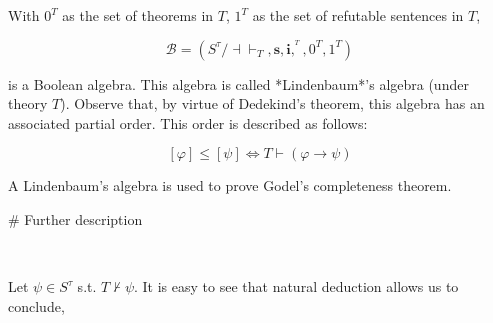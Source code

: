 \documentclass[a4paper, 12pt]{article}
\begin{document}
With $0^T$ as the set of theorems in $T$, $1^T$ as the set of refutable
sentences in $T$,

\begin{equation*}
    \mathcal{B} = \left( S^\tau / \dashv \vdash_T, \textbf{s}, \textbf{i}, ^{^T}, 0^T, 1^T \right) 
\end{equation*}

is a Boolean algebra. This algebra is called *Lindenbaum*'s algebra 
(under theory $T$). Observe that, by virtue of Dedekind's theorem,
this algebra has an associated partial order. This order is described 
as follows: 

\begin{equation*}
    \left[ \varphi \right] \leq \left[ \psi \right]  \iff T \vdash \left( \varphi \to \psi \right) 
\end{equation*}

A Lindenbaum's algebra is used to prove Godel's completeness theorem.

# Further description 

~

Let $\psi \in S^\tau$ s.t. $T \not\vdash \psi$. It is easy to see 
that natural deduction allows us to conclude, 
$$
\end{document}
